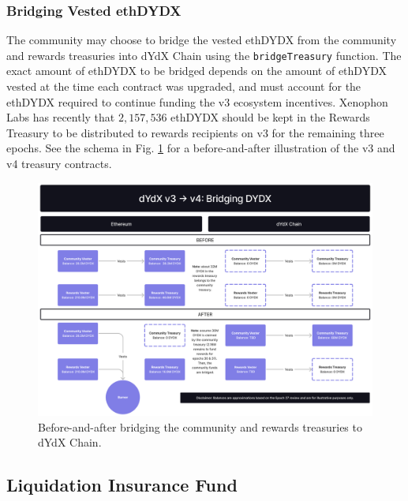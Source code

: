         \subsubsection{Bridging Vested ethDYDX}

            The community may choose to bridge the vested ethDYDX from the community and rewards treasuries into dYdX Chain using the \texttt{bridgeTreasury} function. The exact amount of ethDYDX to be bridged depends on the amount of ethDYDX vested at the time each contract was upgraded, and must account for the ethDYDX required to continue funding the v3 ecosystem incentives. Xenophon Labs has recently  that $2,157,536$ ethDYDX should be kept in the Rewards Treasury to be distributed to rewards recipients on v3 for the remaining three epochs. See the schema in Fig. \ref{fig:bridging} for a before-and-after illustration of the v3 and v4 treasury contracts.

            \begin{figure}[htp]
                \centering
                \includegraphics[width=\linewidth]{figs/Bridging.png}
                \caption{Before-and-after bridging the community and rewards treasuries to dYdX Chain.}
                \label{fig:bridging}
            \end{figure}

    \subsection{Liquidation Insurance Fund}

